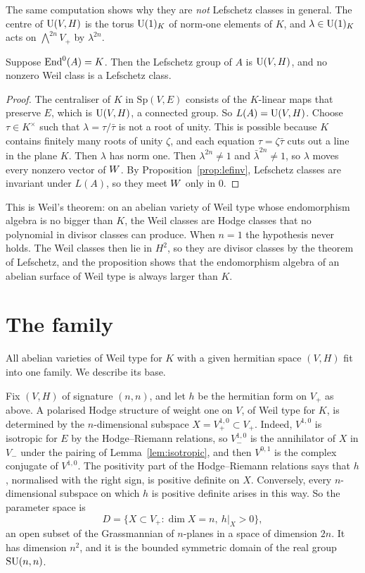 The same computation shows why they are \emph{not} Lefschetz classes in
general. The centre of $\operatorname{U}(V,H)$ is the torus $\operatorname{U}(1)_{K}$ of norm-one
elements of $K$, and $\lambda\in\operatorname{U}(1)_{K}$ acts on $\bigwedge^{2n}V_{+}$ by
$\lambda^{2n}$.

\begin{proposition}\label{prop:weilnotlef}
Suppose $\operatorname{End}^{0}(A)=K$. Then the Lefschetz group of $A$ is $\operatorname{U}(V,H)$,
and no nonzero Weil class is a Lefschetz class.
\end{proposition}

\begin{proof}
The centraliser of $K$ in $\mathrm{Sp}(V,E)$ consists of the $K$-linear maps
that preserve $E$, which is $\operatorname{U}(V,H)$, a connected group. So
$L(A)=\operatorname{U}(V,H)$. Choose $\tau\in K^{\times}$ such that
$\lambda=\tau/\bar\tau$ is not a root of unity. This is possible because
$K$ contains finitely many roots of unity $\zeta$, and each equation
$\tau=\zeta\bar\tau$ cuts out a line in the plane $K$. Then $\lambda$ has
norm one. Then $\lambda^{2n}\ne1$ and $\bar\lambda^{2n}\ne1$,
so $\lambda$ moves every nonzero vector of $W$. By
Proposition~\ref{prop:lefinv}, Lefschetz classes are invariant under
$L(A)$, so they meet $W$ only in $0$.
\end{proof}

This is Weil's theorem: on an abelian variety of Weil type whose
endomorphism algebra is no bigger than $K$, the Weil classes are Hodge
classes that no polynomial in divisor classes can produce. When $n=1$ the
hypothesis never holds. The Weil classes then lie in $H^{2}$, so they are
divisor classes by the theorem of Lefschetz, and the proposition shows that
the endomorphism algebra of an abelian surface of Weil type is always
larger than $K$.

\section{The family}

All abelian varieties of Weil type for $K$ with a given hermitian space
$(V,H)$ fit into one family. We describe its base.

Fix $(V,H)$ of signature $(n,n)$, and let $h$ be the hermitian form on
$V_{+}$ as above. A polarised Hodge structure of weight one on $V$, of Weil
type for $K$, is determined by the $n$-dimensional subspace
$X=V_{+}^{1,0}\subset V_{+}$. Indeed, $V^{1,0}$ is isotropic for $E$ by
the Hodge--Riemann relations, so $V_{-}^{1,0}$ is the annihilator of $X$ in
$V_{-}$ under the pairing of Lemma~\ref{lem:isotropic}, and then
$V^{0,1}$ is the complex conjugate of $V^{1,0}$. The positivity part of
the Hodge--Riemann relations says that $h$, normalised with the right sign,
is positive definite on $X$. Conversely, every $n$-dimensional subspace on
which $h$ is positive definite arises in this way. So the parameter space
is
\[
  D=\{X\subset V_{+}:\dim X=n,\ h|_{X}>0\},
\]
an open subset of the Grassmannian of $n$-planes in a space of dimension
$2n$. It has dimension $n^{2}$, and it is the bounded symmetric domain of
the real group $\operatorname{SU}(n,n)$.

